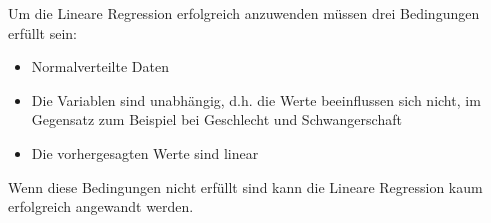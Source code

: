 \documentclass[
  12pt, %
  a4paper, %
  oneside, %
  openany, 
  numbers=noenddot, %
  BCOR=5mm, %
  parskip=half*, %
  thesis, %
]{bfhbook}
\begin{document}
\begin{center}
\begin{minipage}[t]{0.45\linewidth}
\end{minipage}\hfill
\begin{minipage}[t]{0.45\linewidth}
\vspace{0pt}
Um die Lineare Regression erfolgreich anzuwenden müssen drei Bedingungen erfüllt sein:
\begin{itemize}
	\item Normalverteilte Daten
	\item Die Variablen sind unabhängig, d.h. die Werte beeinflussen sich nicht, im Gegensatz zum Beispiel bei Geschlecht und Schwangerschaft
	\item Die vorhergesagten Werte sind linear
\end{itemize}
Wenn diese Bedingungen nicht erfüllt sind kann die Lineare Regression kaum erfolgreich angewandt werden.
\end{minipage}
\end{center}
\end{document}
